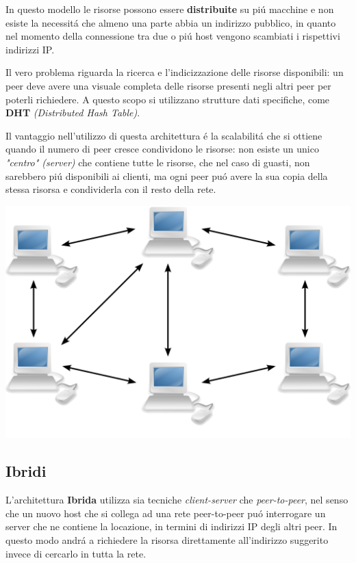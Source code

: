 \documentclass[12pt]{article}
\begin{document}
In questo modello le risorse possono essere \textbf{distribuite} su pi\'u macchine e non esiste la necessit\'a che almeno una parte 
abbia un indirizzo pubblico, in quanto nel momento della connessione tra due o pi\'u host vengono scambiati i rispettivi indirizzi 
IP.

Il vero problema riguarda la ricerca e l'indicizzazione delle risorse disponibili: un peer deve avere una visuale completa delle 
risorse presenti negli altri peer per poterli richiedere. A questo scopo si utilizzano strutture dati specifiche, come \textbf{DHT} 
\textit{(Distributed Hash Table)}.

Il vantaggio nell'utilizzo di questa architettura \'e la scalabilit\'a che si ottiene quando il numero di peer cresce condividono le 
risorse: non esiste un unico \textit{"centro" (server)} che contiene tutte le risorse, che nel caso di guasti, non sarebbero
pi\'u disponibili ai clienti, ma ogni peer pu\'o avere la sua copia della stessa risorsa e condividerla con il resto della rete.\\
\begin{center}
	\includegraphics[scale=0.5]{applicazione-img2.png}
\end{center}

\subsection{Ibridi}\label{ibridi}
L'architettura \textbf{Ibrida} utilizza sia tecniche \textit{client-server} che \textit{peer-to-peer}, nel senso che un nuovo 
host che si collega ad una rete peer-to-peer pu\'o interrogare un server che ne contiene la locazione, in termini di indirizzi IP 
degli altri peer. In questo modo andr\'a a richiedere la risorsa direttamente all'indirizzo suggerito invece di cercarlo in tutta la 
rete.
\end{document}
